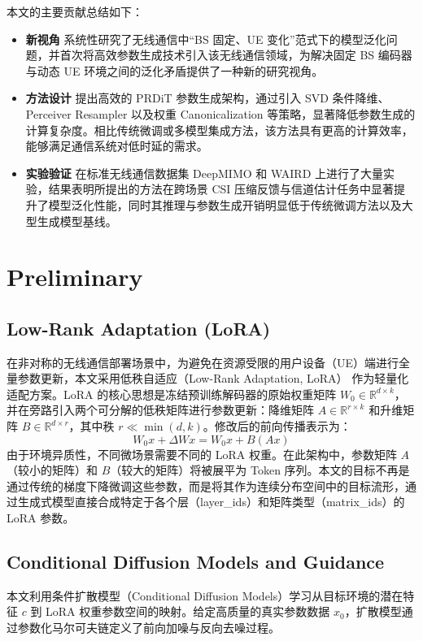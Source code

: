 \documentclass[12pt,a4paper]{article}
\begin{document}
本文的主要贡献总结如下：

\begin{itemize}
    \item \textbf{新视角}
    系统性研究了无线通信中“BS 固定、UE 变化”范式下的模型泛化问题，并首次将高效参数生成技术引入该无线通信领域，为解决固定 BS 编码器与动态 UE 环境之间的泛化矛盾提供了一种新的研究视角。

    \item \textbf{方法设计}
    提出高效的 PRDiT 参数生成架构，通过引入 SVD 条件降维、Perceiver Resampler 以及权重 Canonicalization 等策略，显著降低参数生成的计算复杂度。相比传统微调或多模型集成方法，该方法具有更高的计算效率，能够满足通信系统对低时延的需求。

    \item \textbf{实验验证}
    在标准无线通信数据集 DeepMIMO 和 WAIRD 上进行了大量实验，结果表明所提出的方法在跨场景 CSI 压缩反馈与信道估计任务中显著提升了模型泛化性能，同时其推理与参数生成开销明显低于传统微调方法以及大型生成模型基线。
\end{itemize}


\section{Preliminary}
\label{subsec:preliminaries}

\subsection*{Low-Rank Adaptation (LoRA)}
在非对称的无线通信部署场景中，为避免在资源受限的用户设备（UE）端进行全量参数更新，本文采用低秩自适应（Low-Rank Adaptation, LoRA）\cite{hu2021lora} 作为轻量化适配方案。LoRA 的核心思想是冻结预训练解码器的原始权重矩阵 $W_0 \in \mathbb{R}^{d \times k}$，并在旁路引入两个可分解的低秩矩阵进行参数更新：降维矩阵 $A \in \mathbb{R}^{r \times k}$ 和升维矩阵 $B \in \mathbb{R}^{d \times r}$，其中秩 $r \ll \min(d, k)$。修改后的前向传播表示为：
\begin{equation}
W_0 x + \Delta W x = W_0 x + B(A x)
\end{equation}
由于环境异质性，不同微场景需要不同的 LoRA 权重。在此架构中，参数矩阵 $A$（较小的矩阵）和 $B$（较大的矩阵）将被展平为 Token 序列。本文的目标不再是通过传统的梯度下降微调这些参数，而是将其作为连续分布空间中的目标流形，通过生成式模型直接合成特定于各个层（layer\_ids）和矩阵类型（matrix\_ids）的 LoRA 参数。

\subsection*{Conditional Diffusion Models and Guidance}
本文利用条件扩散模型（Conditional Diffusion Models）学习从目标环境的潜在特征 $c$ 到 LoRA 权重参数空间的映射。给定高质量的真实参数数据 $x_0$，扩散模型通过参数化马尔可夫链定义了前向加噪与反向去噪过程。
\end{document}
